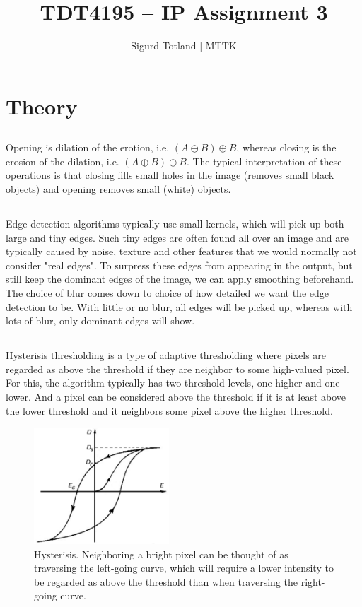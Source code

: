 \documentclass[]{article}
\title{TDT4195 – IP Assignment 3}
\author{Sigurd Totland | MTTK}
\begin{document}
\maketitle

\section{Theory}
\subsection{}
Opening is dilation of the erotion, i.e. $(A \ominus B) \oplus B$, whereas closing is the erosion of the dilation, i.e. $(A \oplus B) \ominus B$. The typical interpretation of these operations is that closing fills small holes in the image (removes small black objects) and opening removes small (white) objects.

\subsection{}
Edge detection algorithms typically use small kernels, which will pick up both large and tiny edges. Such tiny edges are often found all over an image and are typically caused by noise, texture and other features that we would normally not consider "real edges". To surpress these edges from appearing in the output, but still keep the dominant edges of the image, we can apply smoothing beforehand. The choice of blur comes down to choice of how detailed we want the edge detection to be. With little or no blur, all edges will be picked up, whereas with lots of blur, only dominant edges will show.

\subsection{}
Hysterisis thresholding is a type of adaptive thresholding where pixels are regarded as above the threshold if they are neighbor to some high-valued pixel. For this, the algorithm typically has two threshold levels, one higher and one lower. And a pixel can be considered above the threshold if it is at least above the lower threshold and it neighbors some pixel above the higher threshold.
\begin{figure}[H]
\centering
\includegraphics[width=0.45\textwidth]{hysterisis}
\caption{Hysterisis. Neighboring a bright pixel can be thought of as traversing the left-going curve, which will require a lower intensity to be regarded as above the threshold than when traversing the right-going curve.}
\label{fig:hysterisis}
\end{figure}
\end{document}
